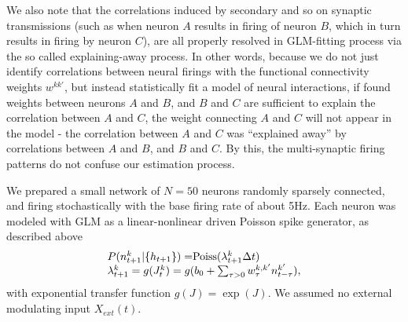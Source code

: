 We also note that the correlations induced by secondary and so on synaptic transmissions (such as when neuron $A$ results in firing of neuron $B$, which in turn results in firing by neuron $C$), are all properly resolved in GLM-fitting process via the so called explaining-away process. In other words, because we do not just identify correlations between neural firings with the functional connectivity weights $w^{kk'}$, but instead statistically fit a model of neural interactions, if found weights between neurons $A$ and $B$, and $B$ and $C$ are sufficient to explain the correlation between $A$ and $C$, the weight connecting $A$ and $C$ will not appear in the model - the correlation between $A$ and $C$ was ``explained away'' by correlations between $A$ and $B$, and $B$ and $C$. By this, the multi-synaptic firing patterns do not confuse our estimation process.

We prepared a small network of $N=50$  neurons randomly sparsely connected, and firing stochastically with the base firing rate of about 5Hz. Each neuron was modeled with GLM as a linear-nonlinear driven Poisson spike generator, as described above
\begin{equation}\label{eqn:glm-def}
\begin{array}{l}
P(n^k_{t+1}|\{h_{t+1}\})=$Poiss$(\lambda^k_{t+1}\Delta t) \\
\lambda^k_{t+1}=g(J^k_t)=g(b_0+\sum_{\tau>0}w^{k,k'}_{\tau}n^{k'}_{t-\tau}),
\end{array}
\end{equation}
with exponential transfer function $g(J)=\exp(J)$. We assumed no external modulating input $X_{ext}(t)$.

